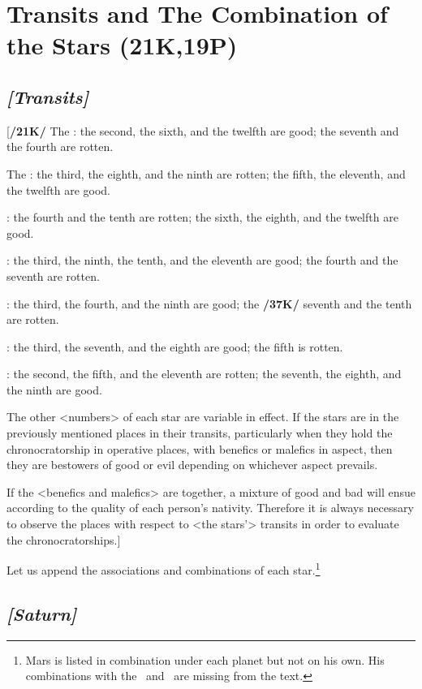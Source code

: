 \section{Transits and The Combination of the Stars (21K,19P)}

\subsection{\textit{[Transits]}}
[\textbf{/21K/}
The \Sun: the second, the sixth, and the twelfth are good; the seventh and the fourth are rotten.

The \Moon: the third, the eighth, and the ninth are rotten; the fifth, the eleventh, and the twelfth are good.

\Saturn: the fourth and the tenth are rotten; the sixth, the eighth, and the twelfth are good.

\Jupiter: the third, the ninth, the tenth, and the eleventh are good; the fourth and the seventh are rotten.

\Mars: the third, the fourth, and the ninth are good; the \textbf{/37K/} seventh and the tenth are rotten.

\Venus: the third, the seventh, and the eighth are good; the fifth is rotten.

\Mercury: the second, the fifth, and the eleventh are rotten; the seventh, the eighth, and the ninth are good.

\mndl[0.2cm]
The other <numbers> of each star are variable in effect.
If the stars are in the previously mentioned places in their transits, particularly when they hold the chronocratorship in operative places, with benefics or malefics in aspect, then they are bestowers of good or evil depending on whichever aspect prevails. 

\mnm[0.3cm]
If the <benefics and malefics> are together, a mixture of good and bad will ensue according to the quality of each person’s nativity. Therefore it is always necessary to
observe the places with respect to <the stars’> transits in order to evaluate the chronocratorships.]

Let us append the associations and combinations of each star.\enlargethispage{2\baselineskip}\footnote{Mars is listed in combination under each planet but not on his own. His combinations with the \Sun\, and \Moon\, are missing from the text.}



\secbr
{}
\subsection{\textit{[Saturn]}}


